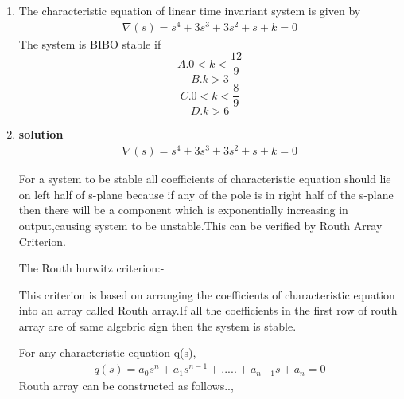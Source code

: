 \begin{enumerate}[label=\thesection.\arabic*.,ref=\thesection.\theenumi]
\item 
The characteristic equation of linear time invariant system is given by
\begin{align} 
\nabla(s)=s^4+3s^3+3s^2+s+k=0
\end{align}
The system is BIBO stable if
\begin{equation}
A.0<k<\dfrac{12}{9}
\end{equation}
\begin{equation}
B.k>3
\end{equation}
\begin{equation}
C.0<k<\dfrac{8}{9}
\end{equation}
\begin{equation}
D.k>6
\end{equation}

\item \textbf{solution}
\begin{align}
\nabla(s)=s^4+3s^3+3s^2+s+k=0
\end{align}

For a system to be stable all coefficients of characteristic equation should lie on left half of s-plane because if any of the pole is in right half of the s-plane then there will be a component which is exponentially increasing in output,causing system to be unstable.This can be verified by Routh Array Criterion.


The Routh hurwitz criterion:-


This criterion is based on arranging the coefficients of characteristic equation into an array called Routh array.If all the coefficients in the first row of routh array are of same algebric sign then the system is stable.


For any characteristic equation q(s),
\begin{multline}
q(s) = a_0s^n+a_1s^{n-1}+.....+a_{n-1}s+a_n = 0
\end{multline}
Routh array can be constructed as follows..,
 

\end{enumerate}
